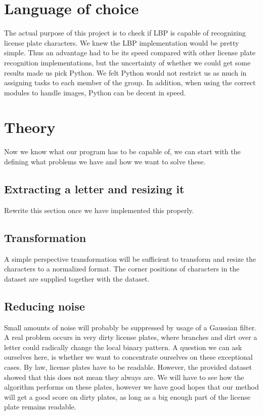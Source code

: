 \documentclass[a4paper]{article}
\begin{document}
\section{Language of choice}

The actual purpose of this project is to check if LBP is capable of recognizing
license plate characters. We knew the LBP implementation would be pretty
simple. Thus an advantage had to be its speed compared with other license plate
recognition implementations, but the uncertainty of whether we could get some
results made us pick Python. We felt Python would not restrict us as much in
assigning tasks to each member of the group. In addition, when using the
correct modules to handle images, Python can be decent in speed.

\section{Theory}

Now we know what our program has to be capable of, we can start with the
defining what problems we have and how we want to solve these.

\subsection{Extracting a letter and resizing it}

Rewrite this section once we have implemented this properly.

\subsection{Transformation}

A simple perspective transformation will be sufficient to transform and resize
the characters to a normalized format. The corner positions of characters in
the dataset are supplied together with the dataset.

\subsection{Reducing noise}

Small amounts of noise will probably be suppressed by usage of a Gaussian
filter. A real problem occurs in very dirty license plates, where branches and
dirt over a letter could radically change the local binary pattern. A question
we can ask ourselves here, is whether we want to concentrate ourselves on these
exceptional cases. By law, license plates have to be readable. However, the
provided dataset showed that this does not mean they always are. We will have
to see how the algorithm performs on these plates, however we have good hopes
that our method will get a good score on dirty plates, as long as a big enough
part of the license plate remains readable.
\end{document}
